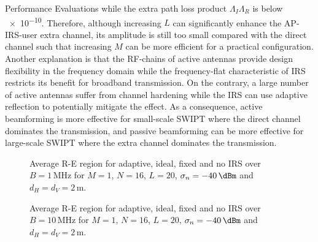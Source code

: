 \documentclass[journal]{IEEEtran}
\begin{document}
\begin{section}{Performance Evaluations}
while the extra path loss product $\Lambda_I\Lambda_R$ is below \num{e-10}. Therefore, although increasing $L$ can significantly enhance the AP-IRS-user extra channel, its amplitude is still too small compared with the direct channel such that increasing $M$ can be more efficient for a practical configuration. Another explanation is that the RF-chains of active antennas provide design flexibility in the frequency domain while the frequency-flat characteristic of IRS restricts its benefit for broadband transmission. On the contrary, a large number of active antennas suffer from channel hardening while the IRS can use adaptive reflection to potentially mitigate the effect. As a consequence, active beamforming is more effective for small-scale SWIPT where the direct channel dominates the transmission, and passive beamforming can be more effective for large-scale SWIPT where the extra channel dominates the transmission.

		\begin{figure}[!t]
			\centering
			\begin{adjustbox}{width=\linewidth}
				
			\end{adjustbox}
			\caption{Average R-E region for adaptive, ideal, fixed and no IRS over $B=1\,\si{\MHz}$ for $M=1$, $N=16$, $L=20$, $\sigma_n=-40\,\si{\dBm}$ and $d_H=d_V=2\,\si{\meter}$.}
			\label{fi:re_irs_1mhz}
		\end{figure}

		\begin{figure}[!t]
			\centering
			\begin{adjustbox}{width=\linewidth}
				
			\end{adjustbox}
			\caption{Average R-E region for adaptive, ideal, fixed and no IRS over $B=10\,\si{\MHz}$ for $M=1$, $N=16$, $L=20$, $\sigma_n=-40\,\si{\dBm}$ and $d_H=d_V=2\,\si{\meter}$.}
			\label{fi:re_irs_10mhz}
		\end{figure}


\end{section}
\end{document}
